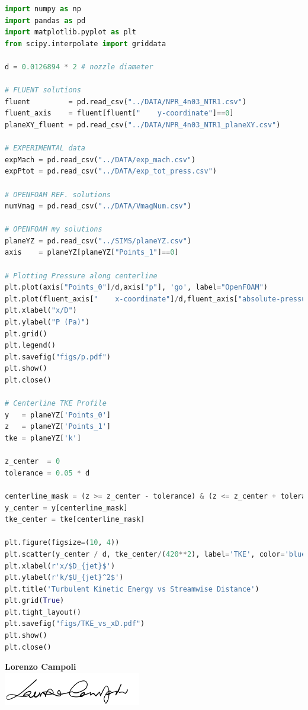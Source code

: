 \documentclass[12pt]{article}
\begin{document}
\begin{lstlisting}[language=Python,caption={Post-processing script.},label={lst:postprocessing}]
import numpy as np
import pandas as pd
import matplotlib.pyplot as plt
from scipy.interpolate import griddata

d = 0.0126894 * 2 # nozzle diameter

# FLUENT solutions
fluent         = pd.read_csv("../DATA/NPR_4n03_NTR1.csv")
fluent_axis    = fluent[fluent["    y-coordinate"]==0]
planeXY_fluent = pd.read_csv("../DATA/NPR_4n03_NTR1_planeXY.csv")

# EXPERIMENTAL data
expMach = pd.read_csv("../DATA/exp_mach.csv")
expPtot = pd.read_csv("../DATA/exp_tot_press.csv")

# OPENFOAM REF. solutions
numVmag = pd.read_csv("../DATA/VmagNum.csv")

# OPENFOAM my solutions
planeYZ = pd.read_csv("../SIMS/planeYZ.csv")
axis    = planeYZ[planeYZ["Points_1"]==0]

# Plotting Pressure along centerline
plt.plot(axis["Points_0"]/d,axis["p"], 'go', label="OpenFOAM")
plt.plot(fluent_axis["    x-coordinate"]/d,fluent_axis["absolute-pressure"],c='b',label="Fluent")
plt.xlabel("x/D")
plt.ylabel("P (Pa)")
plt.grid()
plt.legend()
plt.savefig("figs/p.pdf")
plt.show()
plt.close()

# Centerline TKE Profile
y   = planeYZ['Points_0']
z   = planeYZ['Points_1']
tke = planeYZ['k']

z_center  = 0
tolerance = 0.05 * d

centerline_mask = (z >= z_center - tolerance) & (z <= z_center + tolerance)
y_center = y[centerline_mask]
tke_center = tke[centerline_mask]

plt.figure(figsize=(10, 4))
plt.scatter(y_center / d, tke_center/(420**2), label='TKE', color='blue')
plt.xlabel(r'x/$D_{jet}$')
plt.ylabel(r'k/$U_{jet}^2$')
plt.title('Turbulent Kinetic Energy vs Streamwise Distance')
plt.grid(True)
plt.tight_layout()
plt.savefig("figs/TKE_vs_xD.pdf")
plt.show()
plt.close()
\end{lstlisting}

\vspace{\fill}
\begin{center}
    \hspace*{9.0cm} \LARGE \textbf{Lorenzo Campoli} \\
    \hspace*{9.0cm}\includegraphics[width=0.45\textwidth]{
    signature/signature0.png}
\end{center}
\end{document}
